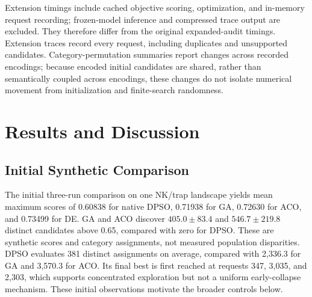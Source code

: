 \documentclass[sigconf,nonacm]{acmart}
\begin{document}
Extension timings include cached objective scoring, optimization, and in-memory request recording; frozen-model inference and compressed trace output are excluded. They therefore differ from the original expanded-audit timings. Extension traces record every request, including duplicates and unsupported candidates. Category-permutation summaries report changes across recorded encodings; because encoded initial candidates are shared, rather than semantically coupled across encodings, these changes do not isolate numerical movement from initialization and finite-search randomness.

\section{Results and Discussion}
\label{sec:results}

\subsection{Initial Synthetic Comparison}
The initial three-run comparison on one NK/trap landscape yields mean maximum scores of 0.60838 for native DPSO, 0.71938 for GA, 0.72630 for ACO, and 0.73499 for DE. GA and ACO discover $405.0\pm83.4$ and $546.7\pm219.8$ distinct candidates above 0.65, compared with zero for DPSO. These are synthetic scores and category assignments, not measured population disparities. DPSO evaluates 381 distinct assignments on average, compared with 2,336.3 for GA and 3,570.3 for ACO. Its final best is first reached at requests 347, 3,035, and 2,303, which supports concentrated exploration but not a uniform early-collapse mechanism. These initial observations motivate the broader controls below.
\end{document}
